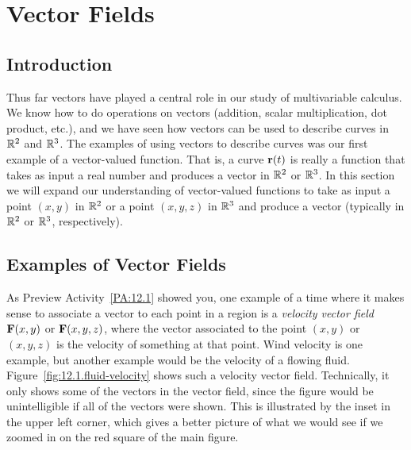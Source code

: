 \section{Vector Fields} \label{S:12.1.VectorFields}


\vspace*{-14 pt}

\subsection*{Introduction}

Thus far vectors have played a central role in our study of
multivariable calculus. We know how to do operations on vectors
(addition, scalar multiplication, dot product, etc.), and we have seen
how vectors can be used to describe curves in $\mathbb{R}^2$ and $\mathbb{R}^3$. The
examples of using vectors to describe curves was our first example of
a vector-valued function. That is, a curve $\mathbf{r}(t)$ is really a
function that takes as input a real number and produces a vector in
$\mathbb{R}^2$ or $\mathbb{R}^3$. In this section we will expand our understanding of
vector-valued functions to take as input a point $(x,y)$ in $\mathbb{R}^2$ or
a point $(x,y,z)$ in $\mathbb{R}^3$ and produce a vector (typically in $\mathbb{R}^2$
or $\mathbb{R}^3$, respectively).




\subsection*{Examples of Vector Fields}

As Preview Activity~\ref{PA:12.1} showed you, one example of a time
where it makes sense to associate a vector to each point in a region
is a \emph{velocity vector field} $\mathbf{F}(x,y)$ or $\mathbf{F}(x,y,z)$, where
the vector associated to the point $(x,y)$ or $(x,y,z)$ is the
velocity of something at that point. Wind velocity is one example, but
another example would be the velocity of a flowing fluid.
Figure~\ref{fig:12.1.fluid-velocity} shows such a velocity vector
field. Technically, it only shows some of the vectors in the vector
field, since the figure would be unintelligible if all of the vectors
were shown. This is illustrated by the inset in the upper left corner,
which gives a better picture of what we would see if we zoomed in on
the red square of the main figure.


